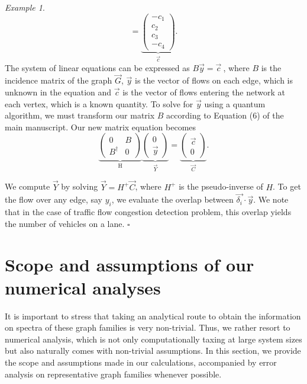 \documentclass[%
 reprint,
 superscriptaddress,
 amsmath,amssymb,
 aps,
 pra,
floatfix,
nofootinbib,
]{revtex4-2}
\theoremstyle{definition}
\theoremstyle{remark}
\newtheorem{example}{Example}
\begin{document}
\begin{appendix}
\begin{example}
\begin{equation}
    =  \underbrace{\begin{pmatrix}
        -c_1 \\
        c_2 \\
        c_3 \\
        -c_4
    \end{pmatrix}}_{\vec{c}}.
\end{equation}
The system of linear equations can be expressed as $B\vec{y}=\vec{c}\ $, where $B$ is the incidence matrix of the graph $\overrightarrow{G}$, $\vec{y}$ is the vector of flows on each edge, which is unknown in the equation and $\vec{c}$ is the vector of flows entering the network at each vertex, which is a known quantity. To solve for $\vec{y}$ using a quantum algorithm, we must transform our matrix $B$ according to Equation (6) of the main manuscript. Our new matrix equation becomes 
\begin{equation} 
\underbrace{   \begin{pmatrix}
        0 & B \\
        B^{\dagger} & 0
    \end{pmatrix}}_{\text{H}}
\underbrace{{\begin{pmatrix}
        0 \\
        \vec{y}
    \end{pmatrix}}}_{\vec{Y}}
    = \underbrace{{\begin{pmatrix}
        \vec{c} \\
        0
    \end{pmatrix}}}_{\vec{C}}. 
\end{equation}  

We compute $\vec{Y}$ by solving $\vec{Y} = H^{+}\vec{C}$, where $H^+$ is the pseudo-inverse of $H$. To get the flow over any edge, say $y_i$, we evaluate the overlap between $\vec{\delta_i} \cdot \vec{y}$. We note that in the case of traffic flow congestion detection problem, this overlap yields the number of vehicles on a lane. \hfill $\square$ 
\end{example} 

\section{Scope and assumptions of our numerical analyses} \label{app:scope}

It is important to stress that taking an analytical route to obtain the information on spectra of these graph families is very non-trivial. Thus, we rather resort to numerical analysis, which is not only computationally taxing at large system sizes but also naturally comes with non-trivial assumptions. In this section, we provide the scope and assumptions made in our calculations, accompanied by error analysis on representative graph families whenever possible. \\


\end{appendix}
\end{document}
